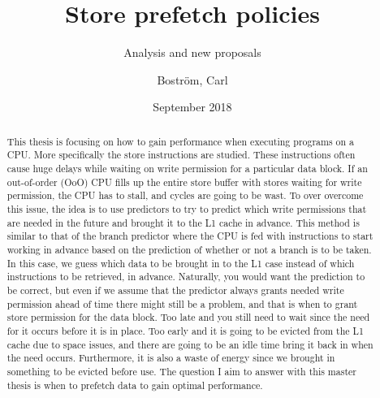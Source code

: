 \documentclass[a4paper,12pt]{article}
\title{Store prefetch policies}
\subtitle{Analysis and new proposals}
\author{Boström, Carl}
\date{September 2018}
\begin{document}
\maketitle
\frontmatter
\begin{abstract}
This thesis is focusing on how to gain performance when executing programs on a CPU. More specifically the store instructions are studied. These instructions often cause huge delays while waiting on write permission for a particular data block. If an out-of-order (OoO) CPU fills up the entire store buffer with stores waiting for write permission, the CPU has to stall, and cycles are going to be wast. To over overcome this issue, the idea is to use predictors to try to predict which write permissions that are needed in the future and brought it to the L1 cache in advance. This method is similar to that of the branch predictor where the CPU is fed with instructions to start working in advance based on the prediction of whether or not a branch is to be taken. In this case, we guess which data to be brought in to the L1 case instead of which instructions to be retrieved, in advance. Naturally, you would want the prediction to be correct, but even if we assume that the predictor always grants needed write permission ahead of time there might still be a problem, and that is when to grant store permission for the data block. Too late and you still need to wait since the need for it occurs before it is in place. Too early and it is going to be evicted from the L1 cache due to space issues, and there are going to be an idle time bring it back in when the need occurs. Furthermore, it is also a waste of energy since we brought in something to be evicted before use. The question I aim to answer with this master thesis is when to prefetch data to gain optimal performance. 
\end{abstract}
\end{document}
